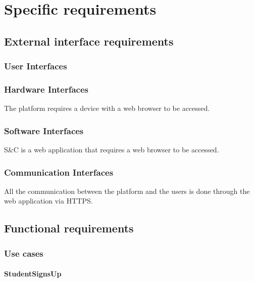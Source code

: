 \chapter{Specific requirements}

\section{External interface requirements}
\subsection{User Interfaces}
\subsection{Hardware Interfaces}
The platform requires a device with a web browser to be accessed.
\subsection{Software Interfaces}
S\&C is a web application that requires a web browser to be accessed.
\subsection{Communication Interfaces}
All the communication between the platform and the users is done through the web application via HTTPS.

\section{Functional requirements}

\subsection{Use cases}

\subsubsection{StudentSignsUp}

